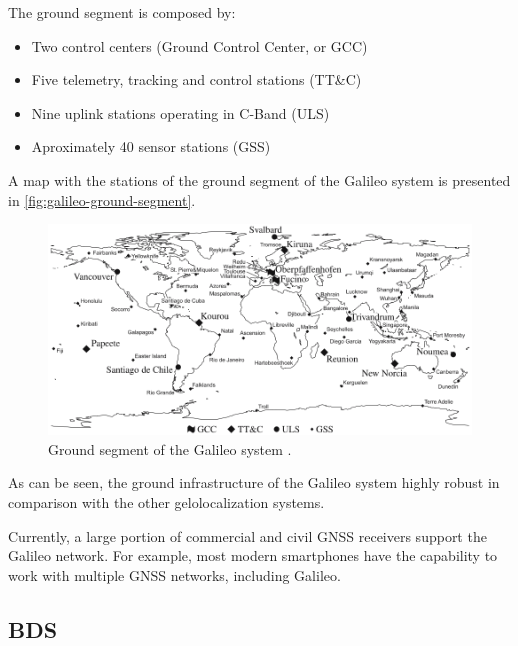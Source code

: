 The ground segment is composed by:

\begin{itemize}
    \item Two control centers (Ground Control Center, or GCC)
    \item Five telemetry, tracking and control stations (TT\&C)
    \item Nine uplink stations operating in C-Band (ULS)
    \item Aproximately 40 sensor stations (GSS)
\end{itemize}

A map with the stations of the ground segment of the Galileo system is presented in \autoref{fig:galileo-ground-segment}.

\begin{figure}[!ht]
    \begin{center}
        \includegraphics[width=\columnwidth]{figures/galileo-ground-segment}
        \caption{Ground segment of the Galileo system \cite{hofmann-wellenhof2007}.}
        \label{fig:galileo-ground-segment}
    \end{center}
\end{figure}

As can be seen, the ground infrastructure of the Galileo system highly robust in comparison with the other gelolocalization systems.

Currently, a large portion of commercial and civil GNSS receivers support the Galileo network. For example, most modern smartphones have the capability to work with multiple GNSS networks, including Galileo.

\subsection{BDS}


